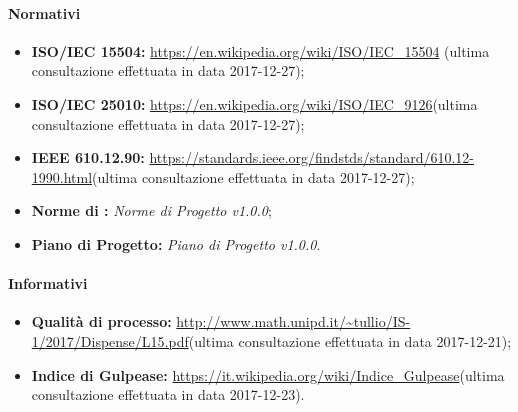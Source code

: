 		\paragraph{Normativi}
			\begin{itemize}
				\item \textbf{ISO/IEC 15504:} \url{https://en.wikipedia.org/wiki/ISO/IEC\_15504} (ultima consultazione effettuata in data 2017-12-27);
				\item \textbf{ISO/IEC 25010:} \url{https://en.wikipedia.org/wiki/ISO/IEC\_9126}(ultima consultazione effettuata in data 2017-12-27);
				\item \textbf{IEEE 610.12.90:} \url{https://standards.ieee.org/findstds/standard/610.12-1990.html}(ultima consultazione effettuata in data 2017-12-27);
				\item \textbf{Norme di :} \emph{Norme di Progetto v1.0.0};
				\item \textbf{Piano di Progetto:} \emph{Piano di Progetto v1.0.0}.
			\end{itemize}

		\paragraph{Informativi} 
			\begin{itemize}
				\item \textbf{Qualità di processo:} \url{http://www.math.unipd.it/~tullio/IS-1/2017/Dispense/L15.pdf}(ultima consultazione effettuata in data 2017-12-21);
				\item \textbf{Indice di Gulpease:} \url{https://it.wikipedia.org/wiki/Indice\_Gulpease}(ultima consultazione effettuata in data 2017-12-23).
			\end{itemize}